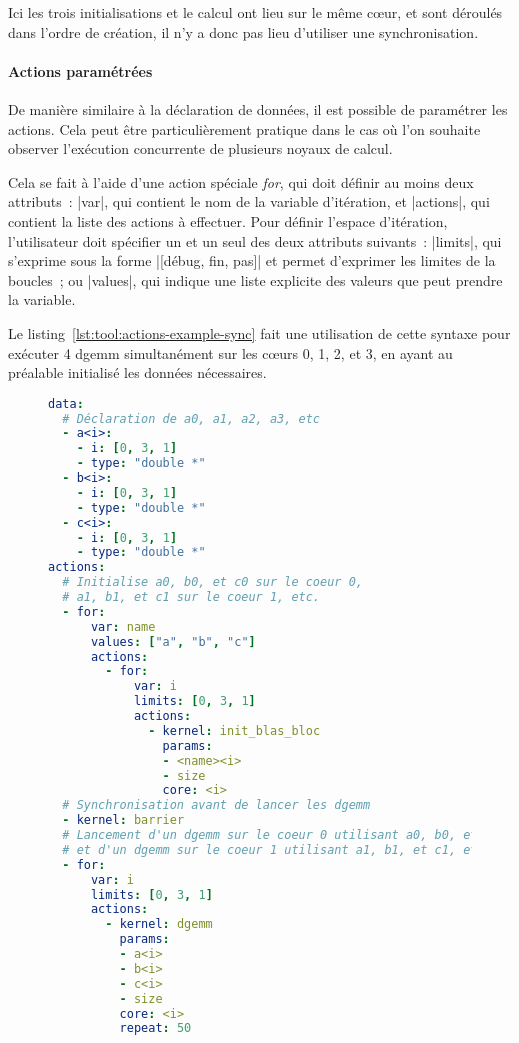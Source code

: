 Ici les trois initialisations et le calcul ont lieu sur le même cœur, et sont déroulés dans l'ordre de création, il n'y a donc pas lieu d'utiliser une synchronisation.

\paragraph{Actions paramétrées}

De manière similaire à la déclaration de données, il est possible de paramétrer les actions.
Cela peut être particulièrement pratique dans le cas où l'on souhaite observer l'exécution concurrente de plusieurs noyaux de calcul.

Cela se fait à l'aide d'une action spéciale \emph{for}, qui doit définir au moins deux attributs~: |var|, qui contient le nom de la variable d'itération, et |actions|, qui contient la liste des actions à effectuer.
Pour définir l'espace d'itération, l'utilisateur doit spécifier un et un seul des deux attributs suivants~: |limits|, qui s'exprime sous la forme |[débug, fin, pas]| et permet d'exprimer les limites de la boucles~; ou |values|, qui indique une liste explicite des valeurs que peut prendre la variable.

Le listing~\ref{lst:tool:actions-example-sync} fait une utilisation de cette syntaxe pour exécuter 4 dgemm simultanément sur les cœurs 0, 1, 2, et 3, en ayant au préalable initialisé les données nécessaires.

\begin{figure}[h!]
\begin{lstlisting}[language=yaml,caption=Exemple de déclaration d'actions synchronisées,label=lst:tool:actions-example-sync]
data:
  # Déclaration de a0, a1, a2, a3, etc
  - a<i>:
    - i: [0, 3, 1]
    - type: "double *"
  - b<i>:
    - i: [0, 3, 1]
    - type: "double *"
  - c<i>:
    - i: [0, 3, 1]
    - type: "double *"
actions:
  # Initialise a0, b0, et c0 sur le coeur 0,
  # a1, b1, et c1 sur le coeur 1, etc.
  - for:
      var: name
      values: ["a", "b", "c"]
      actions:
        - for:
            var: i
            limits: [0, 3, 1]
            actions:
              - kernel: init_blas_bloc
                params:
                - <name><i>
                - size
                core: <i>
  # Synchronisation avant de lancer les dgemm
  - kernel: barrier
  # Lancement d'un dgemm sur le coeur 0 utilisant a0, b0, et c0,
  # et d'un dgemm sur le coeur 1 utilisant a1, b1, et c1, etc.
  - for:
      var: i
      limits: [0, 3, 1]
      actions:
        - kernel: dgemm
          params:
          - a<i>
          - b<i>
          - c<i>
          - size
          core: <i>
          repeat: 50
\end{lstlisting}
\end{figure}

